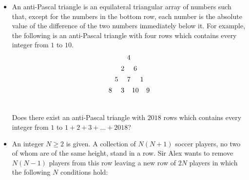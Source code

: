 \documentclass[11pt]{scrartcl}
\begin{document}
\begin{itemize}[leftmargin=*]
At the intersection of two walls there are four corners: two diagonally opposite corners where a red side and a blue side meet, one corner where two red sides meet, and one corner where two blue sides meet. At each such intersection, there is a two-way door connecting the two diagonally opposite corners at which sides of different colours meet.

After Merlin paints the walls, Morgana then places some knights in the labyrinth. The knights can walk through doors, but cannot walk through walls.

Let $k(\mathfrak{L})$ be the largest number $k$ such that, no matter how Merlin paints the labyrinth $\mathfrak{L},$ Morgana can always place at least $k$ knights such that no two of them can ever meet. For each $n,$ what are all possible values for $k(\mathfrak{L}),$ where $\mathfrak{L}$ is a labyrinth with $n$ walls? 
\item {} 	An anti-Pascal triangle is an equilateral triangular array of numbers such that, except for the numbers in the bottom row, each number is the absolute value of the difference of the two numbers immediately below it. For example, the following is an anti-Pascal triangle with four rows which contains every integer from $1$ to $10$.
\[\begin{array}{
c@{\hspace{4pt}}c@{\hspace{4pt}}
c@{\hspace{4pt}}c@{\hspace{2pt}}c@{\hspace{2pt}}c@{\hspace{4pt}}c
} \vspace{4pt}
 & & & 4 & & &  \\\vspace{4pt}
 & & 2 & & 6 & &  \\\vspace{4pt}
 & 5 & & 7 & & 1 & \\\vspace{4pt}
 8 & & 3 & & 10 & & 9 \\\vspace{4pt}
\end{array}\]Does there exist an anti-Pascal triangle with $2018$ rows which contains every integer from $1$ to $1 + 2 + 3 + \dots + 2018$? 
\item {} 	An integer $N \geqslant 2$ is given. A collection of $N(N + 1)$ soccer players, no two of whom are of the same height, stand in a row. Sir Alex wants to remove $N(N - 1)$ players from this row leaving a new row of $2N$ players in which the following $N$ conditions hold:

\end{itemize}
\end{document}
